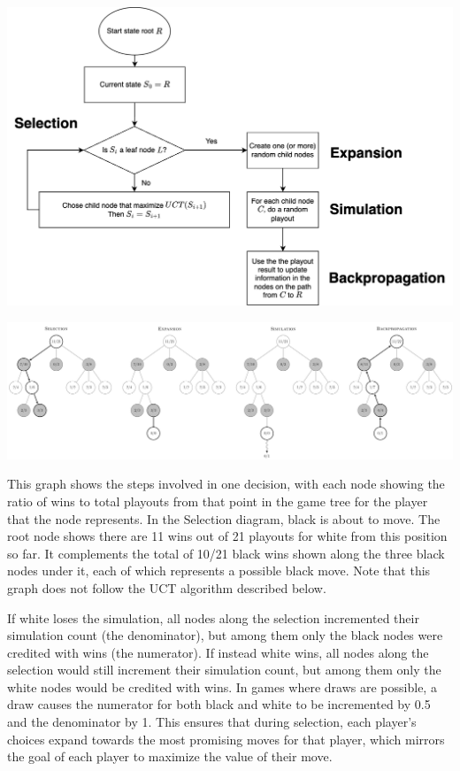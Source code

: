 \documentclass{article}
\begin{document}
\begin{center}
    \includegraphics[scale=0.2]{./images/mcts_flow.png}
\end{center}

\begin{center}
\includegraphics[scale=0.1]{./images/mcts_steps.png}
\end{center}

\noindent This graph shows the steps involved in one decision, with each node showing the ratio of wins to total playouts from that point in the game tree for the player that the node represents. In the Selection diagram, black is about to move. The root node shows there are 11 wins out of 21 playouts for white from this position so far. It complements the total of 10/21 black wins shown along the three black nodes under it, each of which represents a possible black move. Note that this graph does not follow the UCT algorithm described below.

\bigskip

\noindent If white loses the simulation, all nodes along the selection incremented their simulation count (the denominator), but among them only the black nodes were credited with wins (the numerator). If instead white wins, all nodes along the selection would still increment their simulation count, but among them only the white nodes would be credited with wins. In games where draws are possible, a draw causes the numerator for both black and white to be incremented by 0.5 and the denominator by 1. This ensures that during selection, each player's choices expand towards the most promising moves for that player, which mirrors the goal of each player to maximize the value of their move.
\end{document}
